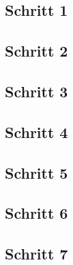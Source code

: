 


\clearpage
\subsection{Schritt 1}


\clearpage
\subsection{Schritt 2}


\clearpage
\subsection{Schritt 3}



\clearpage
\subsection{Schritt 4}


\clearpage
\subsection{Schritt 5}


\clearpage
\subsection{Schritt 6}


\clearpage
\subsection{Schritt 7}
